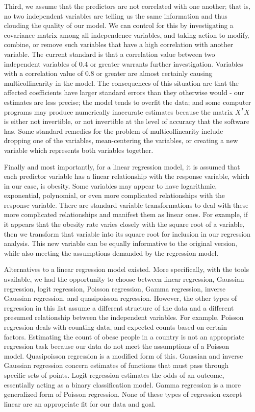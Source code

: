 \documentclass[oneside,12pt]{report}
\begin{document}
Third, we assume that the predictors are not correlated with one another; that is, no two independent variables are telling us the same information and thus clouding the quality of our model. We can control for this by investigating a covariance matrix among all independence variables, and taking action to modify, combine, or remove such variables that have a high correlation with another variable. The current standard is that a correlation value between two independent variables of 0.4 or greater warrants further investigation. Variables with a correlation value of 0.8 or greater are almost certainly causing multicollinearity in the model. The consequences of this situation are that the affected coefficients have larger standard errors than they otherwise would - our estimates are less precise; the model tends to overfit the data; and some computer programs may produce numerically inaccurate estimates because the matrix \begin{math}X^{T}X\end{math} is either not invertible, or not invertible at the level of accuracy that the software has. Some standard remedies for the problem of multicollinearity include dropping one of the variables, mean-centering the variables, or creating a new variable which represents both variables together.

Finally and most importantly, for a linear regression model, it is assumed that each predictor variable has a linear relationship with the response variable, which in our case, is obesity. Some variables may appear to have logarithmic, exponential, polynomial, or even more complicated relationships with the response variable. There are standard variable transformations to deal with these more complicated relationships and manifest them as linear ones. For example, if it appears that the obesity rate varies closely with the square root of a variable, then we transform that variable into its square root for inclusion in our regression analysis. This new variable can be equally informative to the original version, while also meeting the assumptions demanded by the regression model.

Alternatives to a linear regression model existed. More specifically, with the tools available, we had the opportunity to choose between linear regression, Gaussian regression, logit regression, Poisson regression, Gamma regression, inverse Gaussian regression, and quasipoisson regression. However, the other types of regression in this list assume a different structure of the data and a different presumed relationship between the independent variables. For example, Poisson regression deals with counting data, and expected counts based on certain factors. Estimating the count of obese people in a country is not an appropriate regression task because our data do not meet the assumptions of a Poisson model. Quasipoisson regression is a modified form of this. Gaussian and inverse Gaussian regression concern estimates of functions that must pass through specific sets of points. Logit regression estimates the odds of an outcome, essentially acting as a binary classification model. Gamma regression is a more generalized form of Poisson regression. None of these types of regression except linear are an appropriate fit for our data and goal.
\end{document}
